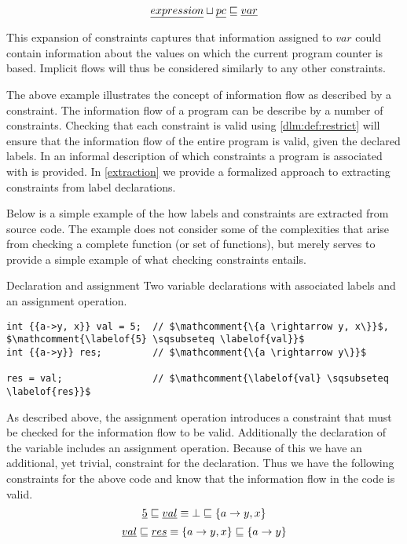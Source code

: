 $$\underline{expression} \sqcup \underline{pc} \sqsubseteq \underline{var}$$

This expansion of constraints captures that information assigned to $var$ could contain information about the values on which the current program counter is based.
Implicit flows will thus be considered similarly to any other constraints.

The above example illustrates the concept of information flow as described by a constraint.
The information flow of a program can be describe by a number of constraints.
Checking that each constraint is valid using \cref{dlm:def:restrict} will ensure that the information flow of the entire program is valid, given the declared labels.
In \cite{myers1997, myers1998, myers2000} an informal description of which constraints a program is associated with is provided.
In \cref{extraction} we provide a formalized approach to extracting constraints from label declarations.

Below is a simple example of the how labels and constraints are extracted from source code.
The example does not consider some of the complexities that arise from checking a complete function (or set of functions), but merely serves to provide a simple example of what checking constraints entails.

\begin{example}{Declaration and assignment}\label{dlm:ex:extract}
  Two variable declarations with associated labels and an assignment operation.

  \begin{lstlisting}[style=dlmc]
int {{a->y, x}} val = 5;  // $\mathcomment{\{a \rightarrow y, x\}}$, $\mathcomment{\labelof{5} \sqsubseteq \labelof{val}}$
int {{a->y}} res;         // $\mathcomment{\{a \rightarrow y\}}$

res = val;                // $\mathcomment{\labelof{val} \sqsubseteq \labelof{res}}$
  \end{lstlisting}

  As described above, the assignment operation introduces a constraint that must be checked for the information flow to be valid.
  Additionally the declaration of the  variable includes an assignment operation.
  Because of this we have an additional, yet trivial, constraint for the declaration.
  Thus we have the following constraints for the above code and know that the information flow in the code is valid.
  $$\underline{5} \sqsubseteq \underline{val} \equiv \bot \sqsubseteq \{a \rightarrow y, x\}$$
  $$\underline{val} \sqsubseteq \underline{res} \equiv \{a \rightarrow y, x\} \sqsubseteq \{a \rightarrow y\}$$
\end{example}

